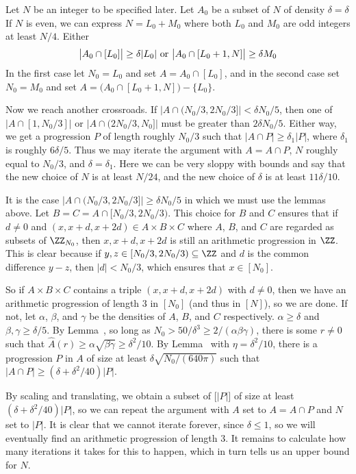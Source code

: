 \proof Let $N$ be an integer to be specified later. Let $A_0$ be a subset of $N$ of density
$\delta = \delta$If $N$ is even, we can express $N = L_0+M_0$
where both $L_0$ and $M_0$ are odd integers at least $N/4$. Either
$$\bigl|A_0 \cap [L_0]\bigr| \ge \delta |L_0|\ \hbox{or}
\ \bigl|A_0\cap [L_0+1, N]\bigr| \ge \delta M_0$$
In the first case let $N_0 = L_0$ and set $A = A_0\cap [L_0]$, and in the second case set $N_0=M_0$
and set $A = \bigl(A_0\cap [L_0+1,N]\bigr) - \{L_0\}$.

Now we reach another crossroads. If $\bigl| A\cap (N_0/3, 2N_0/3]\bigr| < \delta N_0/5$, then one of
$\bigl| A\cap [1,N_0/3]\bigr|$ or $\bigl| A\cap (2N_0/3,N_0]\bigr|$ must be greater than $2\delta N_0 / 5$.
Either way, we get a progression $P$ of length roughly $N_0/3$ such that $|A\cap P| \ge \delta_1|P|$,
where $\delta_1$ is roughly $6\delta/5$. Thus we may iterate the argument with $A = A\cap P$, $N$
roughly equal to $N_0/3$, and $\delta = \delta_1$. Here we can be very sloppy with bounds and say that
the new choice of $N$ is at least $N/24$, and the new choice of $\delta$ is at least $11\delta/10$.

It is the case $\bigl| A\cap (N_0/3, 2N_0/3]\bigr| \ge \delta N_0/5$ in which we must use the lemmas
above. Let $B = C = A\cap [N_0/3, 2N_0/3)$. This choice for $B$ and $C$ ensures that if $d\ne 0$ and
$(x,x+d,x+2d)\in A\times B\times C$ where $A$, $B$, and $C$ are regarded as subsets of $\ZZ_{N_0}$, then
$x,x+d,x+2d$ is still an arithmetic progression in $\ZZ$. This is clear because if
$y,z\in [N_0/3,2N_0/3)\subseteq \ZZ$ and $d$ is the common difference $y-z$, then $|d| < N_0/3$, which
ensures that $x\in [N_0]$.

So if $A\times B\times C$ contains a triple $(x,x+d,x+2d)$ with $d\ne 0$, then we have an arithmetic
progression of length $3$ in $[N_0]$ (and thus in $[N]$), so we are done. If not,
let $\alpha$, $\beta$, and $\gamma$ be the densities of $A$, $B$, and $C$ respectively.
$\alpha \ge \delta$ and $\beta,\gamma\ge \delta/5$. By Lemma~{\lemABC}, so long as
$N_0 > 50/\delta^3 \ge 2/(\alpha\beta\gamma)$, there is some $r\ne 0$ such that
$\hat A(r) \ge \alpha\sqrt{\beta\gamma} \ge \delta^2/10$. By Lemma~{\lemdensityincrement} with
$\eta = \delta^2/10$, there is a progression $P$ in $A$ of size at least $\delta \sqrt{N_0/(640\pi)}$
such that $|A\cap P| \ge (\delta + \delta^2/40)|P|$.

By scaling and translating, we obtain a subset of $\bigl[|P|\bigr]$ of size at least $(\delta+\delta^2/40)|P|$,
so we can repeat the argument with $A$ set to $A = A\cap P$ and $N$ set to $|P|$. It is clear that
we cannot iterate forever, since $\delta \le 1$, so we will eventually find an arithmetic progression
of length $3$. It remains to calculate how many iterations it takes for this to happen, which in turn tells
us an upper bound for $N$.

